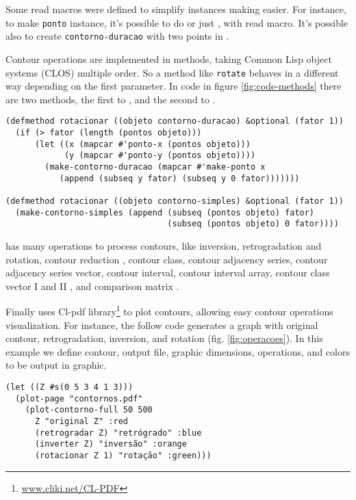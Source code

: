 Some read macros were defined to simplify instances making easier. For
instance, to make \texttt{ponto} instance, it's possible to do
 or just , with
read macro. It's possible also to create \texttt{contorno-duracao}
with two points in .

Contour operations are implemented in methods, taking Common Lisp
object systems (CLOS) multiple order. So a method like \texttt{rotate}
behaves in a different way depending on the first parameter. In code
in figure \ref{fig:code-methods} there are two methods, the first to
, and the second to .

\begin{figure*}
\begin{verbatim}
(defmethod rotacionar ((objeto contorno-duracao) &optional (fator 1))
  (if (> fator (length (pontos objeto)))
      (let ((x (mapcar #'ponto-x (pontos objeto)))
            (y (mapcar #'ponto-y (pontos objeto))))
        (make-contorno-duracao (mapcar #'make-ponto x
           (append (subseq y fator) (subseq y 0 fator)))))))

(defmethod rotacionar ((objeto contorno-simples) &optional (fator 1))
  (make-contorno-simples (append (subseq (pontos objeto) fator)
                                 (subseq (pontos objeto) 0 fator))))
\end{verbatim}
  \caption{Methods}
  \label{fig:code-methods}
\end{figure*}

\goiaba{} has many operations to process contours, like inversion,
retrogradation and rotation, contour reduction \cite{adams76:melodic},
contour class, contour adjacency series, contour adjacency series
vector, contour interval, contour interval array, contour class vector
I and II \cite{friedmann85:methodology}, and comparison matrix
\cite{morris93:directions}.

Finally \goiaba{} uses Cl-pdf
library\footnote{\url{www.cliki.net/CL-PDF}} to plot contours,
allowing easy contour operations visualization. For instance, the
follow code generates a graph with original contour, retrogradation,
inversion, and rotation (fig. \ref{fig:operacoes}). In this example we
define  contour, output file, graphic dimensions, operations,
and colors to be output in graphic.

\begin{verbatim}
(let ((Z #s(0 5 3 4 1 3)))
  (plot-page "contornos.pdf"
    (plot-contorno-full 50 500
      Z "original Z" :red
      (retrogradar Z) "retrógrado" :blue
      (inverter Z) "inversão" :orange
      (rotacionar Z 1) "rotação" :green)))
\end{verbatim}

